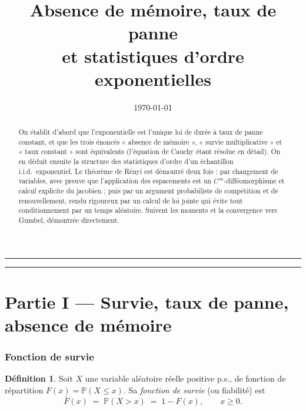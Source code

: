 \documentclass[11pt,a4paper]{article}
\title{\bfseries Absence de mémoire, taux de panne\\
et statistiques d'ordre exponentielles}
\author{}
\date{\today}
\theoremstyle{plain}
\theoremstyle{definition}
\newtheorem{definition}[theoreme]{Définition}
\theoremstyle{remark}
\newcommand{\Prob}{\mathbb{P}}
\newcommand{\barF}{\bar{F}}
\begin{document}
\maketitle
\vspace{-2.4em}
\begin{center}\rule{0.5\textwidth}{0.4pt}\end{center}

\begin{abstract}
\noindent
On établit d'abord que l'exponentielle est l'unique loi de durée à taux de panne
constant, et que les trois énoncés « absence de mémoire », « survie
multiplicative » et « taux constant » sont équivalents (l'équation de Cauchy
étant résolue en détail). On en déduit ensuite la structure des statistiques
d'ordre d'un échantillon i.i.d.\ exponentiel. Le théorème de Rényi est démontré
deux fois : par changement de variables, avec preuve que l'application des
espacements est un $C^\infty$-difféomorphisme et calcul explicite du jacobien ;
puis par un argument probabiliste de compétition et de renouvellement, rendu
rigoureux par un calcul de loi jointe qui évite tout conditionnement par un temps
aléatoire. Suivent les moments et la convergence vers Gumbel, démontrée
directement.
\end{abstract}

\tableofcontents
\vspace{0.8em}

\begin{center}\rule{0.35\textwidth}{0.4pt}\end{center}
\part*{Partie I --- Survie, taux de panne, absence de mémoire}

\section{Fonction de survie}

\begin{definition}
Soit $X$ une variable aléatoire réelle positive p.s., de fonction de répartition
$F(x)=\Prob(X\le x)$. Sa \emph{fonction de survie} (ou fiabilité) est
\[
\barF(x)\;=\;\Prob(X>x)\;=\;1-F(x),\qquad x\ge 0 .
\]
\end{definition}
\end{document}
